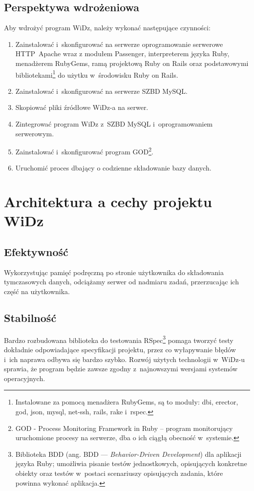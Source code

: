 \documentclass[12pt,leqno,twoside]{mwart}
\begin{document}
\subsection{Perspektywa wdrożeniowa}
\noindent Aby wdrożyć program WiDz, należy wykonać następujące czynności:
\begin{enumerate}
	\item Zainstalować i~skonfigurować na serwerze oprogramowanie serwerowe \hbox{HTTP Apache} wraz z modułem Passenger, interpreterem języka Ruby, menadżerem RubyGems, ramą projektową Ruby on Rails oraz podstawowymi bibliotekami\footnote{Instalowane za pomocą menadżera RubyGems, są to moduły: dbi, erector, god, json, mysql, net-ssh, rails, rake i~rspec.} do użytku w~środowisku Ruby on Rails.
	\item Zainstalować i~skonfigurować na serwerze SZBD MySQL.
	\item Skopiować pliki źródłowe WiDz-a na serwer.
	\item Zintegrować program WiDz z~SZBD MySQL i~oprogramowaniem serwerowym.
	\item Zainstalować i~skonfigurować program GOD\footnote{GOD - Process Monitoring Framework in Ruby -- program monitorujący uruchomione procesy na serwerze, dba o ich ciągłą obecność w~systemie.}.
	\item Uruchomić proces dbający o codzienne składowanie bazy danych.
\end{enumerate}

\section{Architektura a cechy projektu WiDz}
\subsection{Efektywność}
\noindent Wykorzystując pamięć podręczną po stronie użytkownika do składowania tymczasowych danych, odciążamy serwer od nadmiaru zadań, przerzucając ich część na użytkownika.
 
\subsection{Stabilność}
\noindent Bardzo rozbudowana biblioteka do testowania RSpec\footnote{Biblioteka BDD (ang. BDD --- \textit{Behavior-Driven Development}) dla aplikacji języka Ruby; umożliwia pisanie testów jednostkowych, opisujących konkretne obiekty oraz testów w~postaci scenariuszy opisujących zadania, które powinna wykonać aplikacja.} pomaga tworzyć testy dokładnie odpowiadające specyfikacji projektu, przez co wyłapywanie błędów i~ich naprawa odbywa się bardzo szybko. Rozwój użytych technologii w~WiDz-u sprawia, że program będzie zawsze zgodny z~najnowszymi wersjami systemów operacyjnych.
\end{document}
